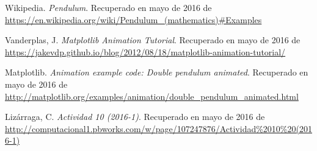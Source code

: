 \documentclass[12pt]{article}
\begin{document}
\begin{thebibliography}{6}

Wikipedia.
\emph{Pendulum}. Recuperado en mayo de 2016 de \url{https://en.wikipedia.org/wiki/Pendulum_(mathematics)#Examples}

Vanderplas, J.
\emph{Matplotlib Animation Tutorial}. Recuperado en mayo de 2016 de \url{https://jakevdp.github.io/blog/2012/08/18/matplotlib-animation-tutorial/}

Matplotlib.
\emph{Animation example code: Double pendulum animated}. Recuperado en mayo de 2016 de \url{http://matplotlib.org/examples/animation/double_pendulum_animated.html}

Lizárraga, C.
\emph{Actividad 10 (2016-1)}. Recuperado en mayo de 2016 de \url{http://computacional1.pbworks.com/w/page/107247876/Actividad\%2010\%20(2016-1)}

\end{thebibliography}
\end{document}
